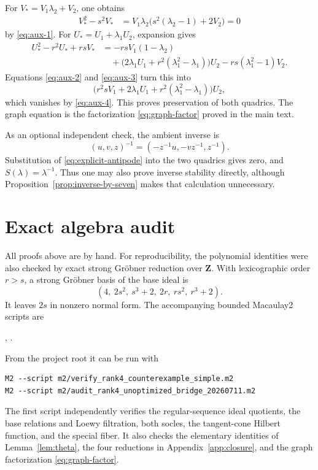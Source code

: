 \documentclass[11pt]{amsart}
\theoremstyle{definition}
\theoremstyle{remark}
\newcommand{\Z}{\mathbf Z}
\begin{document}
For \(V_*=V_1\lambda_2+V_2\), one obtains
\begin{align*}
 V_*^2-s^2V_*
 &=V_1\lambda_2\bigl(s^2(\lambda_2-1)+2V_2\bigr)=0
\end{align*}
by \eqref{eq:aux-1}.  For \(U_*=U_1+\lambda_1U_2\), expansion gives
\begin{align*}
 U_*^2-r^2U_*+rsV_*
 &=-rsV_1(1-\lambda_2)\\
 &\quad+
 \bigl(2\lambda_1U_1+r^2(\lambda_1^2-\lambda_1)\bigr)U_2
 -rs(\lambda_1^2-1)V_2.
\end{align*}
Equations \eqref{eq:aux-2} and \eqref{eq:aux-3} turn this into
\[
 \bigl(r^2sV_1+2\lambda_1U_1
       +r^2(\lambda_1^2-\lambda_1)\bigr)U_2,
\]
which vanishes by \eqref{eq:aux-4}.  This proves preservation of both
quadrics.  The graph equation is the factorization
\eqref{eq:graph-factor} proved in the main text.

As an optional independent check, the ambient inverse is
\[
 (u,v,z)^{-1}=(-z^{-1}u,-vz^{-1},z^{-1}).
\]
Substitution of \eqref{eq:explicit-antipode} into the two quadrics gives
zero, and \(S(\lambda)=\lambda^{-1}\).  Thus one may also prove inverse
stability directly, although Proposition~\ref{prop:inverse-by-seven} makes
that calculation unnecessary.

\section{Exact algebra audit}\label{app:audit}

All proofs above are by hand.  For reproducibility, the polynomial
identities were also checked by exact strong Gr\"obner reduction over
\(\Z\).  With lexicographic order \(r>s\), a strong Gr\"obner basis of the
base ideal is
\[
 (4,\ 2s^2,\ s^3+2,\ 2r,\ rs^2,\ r^3+2).
\]
It leaves \(2s\) in nonzero normal form.  The accompanying bounded
Macaulay2 scripts are
\begin{center}
 ,
 \qquad
 .
\end{center}
From the project root it can be run with
\begin{verbatim}
M2 --script m2/verify_rank4_counterexample_simple.m2
M2 --script m2/audit_rank4_unoptimized_bridge_20260711.m2
\end{verbatim}
The first script independently verifies the regular-sequence ideal quotients,
the base relations and Loewy filtration, both socles, the tangent-cone
Hilbert function, and the special fiber.  It also checks the elementary
identities of Lemma~\ref{lem:theta}, the four reductions in
Appendix~\ref{app:closure}, and the graph factorization
\eqref{eq:graph-factor}.
\end{document}

